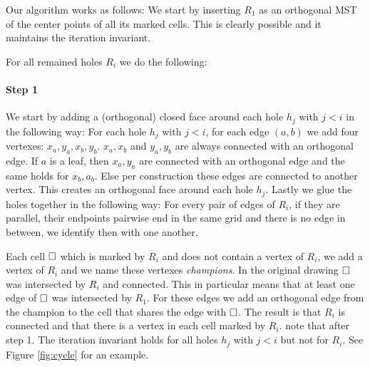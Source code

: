 \documentclass[a4paper, UKenglish]{lipics-v2018}
\newcommand{\pix}{\square}
\begin{document}
Our algorithm works as follows: We start by inserting $R_1$ as an orthogonal MST of the center points of all its marked cells. This is clearly possible and it maintains the iteration invariant.



For all remained holes $R_i$ we do the following:

\paragraph*{Step 1}
We start by adding a (orthogonal) closed face around each hole $h_j$ with $j < i$ in the following way:
For each hole $h_j$ with $j < i$, for each edge $(a,b)$ we add four vertexes: $x_a, y_a, x_b, y_b$.  $x_a, x_b$ and $y_a,y_b$ are always connected with an orthogonal edge. If $a$ is a leaf, then $x_a,y_a$ are connected with an orthogonal edge and the same holds for $x_b,a_b$. Else per construction these edges are connected to another vertex. This creates an orthogonal face around each hole $h_j$.
Lastly we glue the holes together in the following way: For every pair of edges of $R_i$, if they are parallel, their endpoints pairwise end in the same grid and there is no edge in between, we identify then with one another. 

Each cell $\hfill\pix$ which is marked by $R_i$ and does not contain a vertex of $R_i$, we add a vertex of $R_i$ and we name these vertexes \emph{champions}. In the original drawing $\hfill\pix$ was intersected by $R_i$ and connected. This in particular means that at least one edge of $\hfill\pix$ was intersected by $R_1$. For these edges we add an orthogonal edge from the champion to the cell that shares the edge with $\hfill\pix$. The result is that $R_i$ is connected and that there is a vertex in each cell marked by $R_i$.
note that after step 1. The iteration invariant holds for all holes $h_j$ with $j < i$ but not for $R_i$. See Figure \ref{fig:cycle} for an example.
\end{document}
